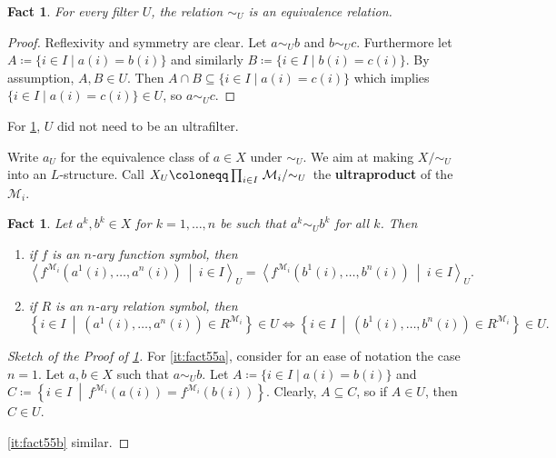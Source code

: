 \documentclass{article}
\newtheorem{nfact}[nthm]{Fact}
\newcommand{\named}[1]{\textbf{#1}\index{#1}}
\begin{document}
\begin{nfact} \label{fact:5.4}
For every filter $U$, the relation $\sim_U$ is an equivalence relation.
\end{nfact}
\begin{proof}
Reflexivity and symmetry are clear. Let $a \sim_U b$ and $b \sim_U c$. Furthermore let $A \coloneqq \{i \in I \mid a(i)=b(i) \}$ and similarly $B \coloneqq \{i \in I \mid b(i)=c(i) \}$. By assumption, $A, B \in U$. Then  $ A \cap B \subseteq \{i \in I \mid a(i) = c(i)\}$
which implies $\{i \in I \mid a(i) = c(i)\} \in U$, so $a \sim_U c$.
\end{proof}
\begin{remark}
For \cref{fact:5.4}, $U$ did not need to be an ultrafilter.
\end{remark}

Write $a_U$ for the equivalence class of $a \in X$ under $\sim_U$. We aim at making $X/{\sim_U}$ into an $L$-structure. Call $X_U \coloneqq \prod_{i \in I} \left. \mathcal{M}_i \middle/ {\sim_U} \right.$ the \named{ultraproduct} of the $\mathcal{M}_i$.

\begin{nfact} \label{fact:5.5}
Let $a^k, b^k \in X$ for $k = 1, \dots, n$ be such that $a^k \sim_U b^k$ for all $k$. Then
\begin{enumerate}[label=(\roman*)]
\item if $f$ is an $n$-ary function symbol, then
\[
\left< f^{\mathcal{M}_i}(a^1(i), \dots, a^n(i)) \ \middle|\ i \in I \right>_U = 
\left< f^{\mathcal{M}_i}(b^1(i), \dots, b^n(i)) \ \middle|\ i \in I \right>_U.
\] \label{it:fact55a}
\item if $R$ is an $n$-ary relation symbol, then 
\[
\left\{ i \in I \ \middle|\ (a^1(i), \dots, a^n(i)) \in R^{\mathcal{M}_i} \right\} \in U \iff
\left\{ i \in I \ \middle|\ (b^1(i), \dots, b^n(i)) \in R^{\mathcal{M}_i} \right\} \in U.
\] \label{it:fact55b}
\end{enumerate}
\end{nfact}
\begin{proof}[Sketch of the Proof of \cref{fact:5.5}]
For \cref{it:fact55a}, consider for an ease of notation the case $n = 1$. Let $a, b \in X$ such that $a \sim_U b$. Let  $A \coloneqq \{i \in I \mid a(i)=b(i) \}$ and $C \coloneqq \left\{ i \in I \ \middle|\ f^{\mathcal{M}_i}(a(i)) = f^{\mathcal{M}_i}(b(i)) \right\}$. Clearly, $A \subseteq C$, so if $A \in U$, then $C \in U$.

\cref{it:fact55b} similar.
\end{proof}
\end{document}
